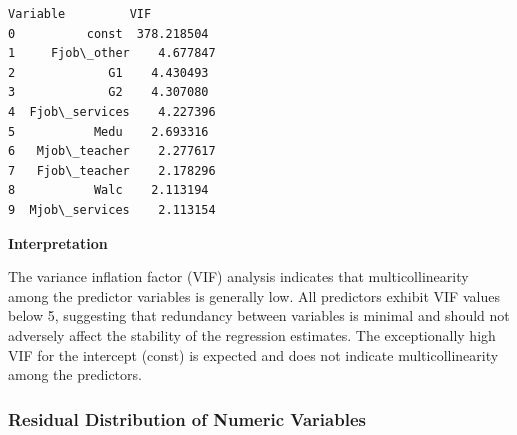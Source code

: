 \documentclass[9pt]{article}
\begin{document}
    
    \begin{Verbatim}[commandchars=\\\{\}]
        Variable         VIF
0          const  378.218504
1     Fjob\_other    4.677847
2             G1    4.430493
3             G2    4.307080
4  Fjob\_services    4.227396
5           Medu    2.693316
6   Mjob\_teacher    2.277617
7   Fjob\_teacher    2.178296
8           Walc    2.113194
9  Mjob\_services    2.113154
    \end{Verbatim}

    
    \textbf{Interpretation}

The variance inflation factor (VIF) analysis indicates that
multicollinearity among the predictor variables is generally low. All
predictors exhibit VIF values below 5, suggesting that redundancy
between variables is minimal and should not adversely affect the
stability of the regression estimates. The exceptionally high VIF for
the intercept (const) is expected and does not indicate
multicollinearity among the predictors.

    \hypertarget{residual-distribution-of-numeric-variables}{%
\subsubsection{Residual Distribution of Numeric
Variables}\label{residual-distribution-of-numeric-variables}}
\end{document}
